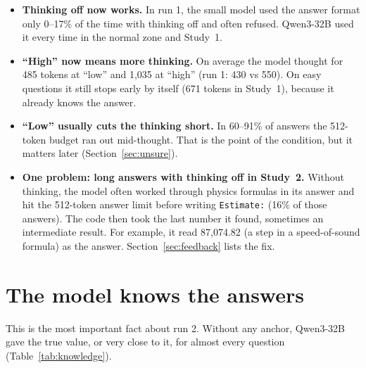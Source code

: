 \documentclass[11pt,a4paper]{article}
\begin{document}
\begin{itemize}
  \item \textbf{Thinking off now works.} In run 1, the small model used the answer format only 0--17\% of the time with thinking off and often refused. Qwen3-32B used it every time in the normal zone and Study~1.
  \item \textbf{\enquote{High} now means more thinking.} On average the model thought for 485 tokens at \enquote{low} and 1,035 at \enquote{high} (run 1: 430 vs 550). On easy questions it still stops early by itself (671 tokens in Study~1), because it already knows the answer.
  \item \textbf{\enquote{Low} usually cuts the thinking short.} In 60--91\% of answers the 512-token budget ran out mid-thought. That is the point of the condition, but it matters later (Section~\ref{sec:unsure}).
  \item \textbf{One problem: long answers with thinking off in Study~2.} Without thinking, the model often worked through physics formulas in its answer and hit the 512-token answer limit before writing \texttt{Estimate:} (16\% of those answers). The code then took the last number it found, sometimes an intermediate result. For example, it read 87,074.82 (a step in a speed-of-sound formula) as the answer. Section~\ref{sec:feedback} lists the fix.
\end{itemize}

\section{The model knows the answers}

This is the most important fact about run 2. Without any anchor, Qwen3-32B gave the true value, or very close to it, for almost every question (Table~\ref{tab:knowledge}).
\end{document}

